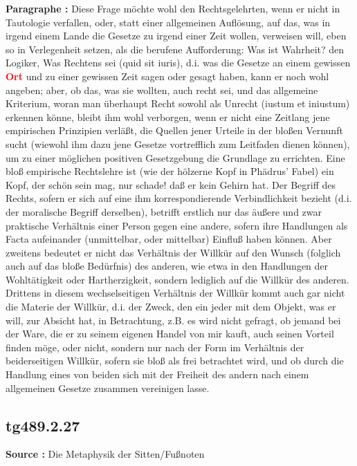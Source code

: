 \documentclass[a4paper,12pt,twoside]{book}
\newcommand{\match}[1]{\textcolor{red}{\textbf{#1}}}
\begin{document}
	\textbf{Paragraphe : }Diese Frage möchte wohl den Rechtsgelehrten, wenn er nicht in Tautologie verfallen, oder, statt einer allgemeinen Auflösung, auf das, was in irgend einem Lande die Gesetze zu irgend einer Zeit wollen, verweisen will, eben so in Verlegenheit setzen, als die berufene Aufforderung: Was ist Wahrheit? den Logiker, Was Rechtens sei (quid sit iuris), d.i. was die Gesetze an einem gewissen \match{Ort} und zu einer gewissen Zeit sagen oder gesagt haben, kann er noch wohl angeben; aber, ob das, was sie wollten, auch recht sei, und das allgemeine Kriterium, woran man überhaupt Recht sowohl als Unrecht (iustum et iniustum) erkennen könne, bleibt ihm wohl verborgen, wenn er nicht eine Zeitlang jene empirischen Prinzipien verläßt, die Quellen jener Urteile in der bloßen Vernunft sucht (wiewohl ihm dazu jene Gesetze vortrefflich zum Leitfaden dienen können), um zu einer möglichen positiven Gesetzgebung die Grundlage zu errichten. Eine bloß empirische Rechtslehre ist (wie der hölzerne Kopf in Phädrus' Fabel) ein Kopf, der schön sein mag, nur schade! daß er kein Gehirn hat.  Der Begriff des Rechts, sofern er sich auf eine ihm korrespondierende Verbindlichkeit bezieht (d.i. der moralische Begriff derselben), betrifft erstlich nur das äußere und zwar praktische Verhältnis einer Person gegen eine andere, sofern ihre Handlungen als Facta aufeinander (unmittelbar, oder mittelbar) Einfluß haben können. Aber zweitens bedeutet er nicht das Verhältnis der Willkür auf den Wunsch (folglich auch auf das bloße Bedürfnis) des anderen, wie etwa in den Handlungen der Wohltätigkeit oder Hartherzigkeit, sondern lediglich auf die Willkür des anderen. Drittens in diesem wechselseitigen Verhältnis der Willkür kommt auch gar nicht die Materie der Willkür, d.i. der Zweck, den ein jeder mit dem Objekt, was er will, zur Absicht hat, in Betrachtung, z.B. es wird nicht gefragt, ob jemand bei der Ware, die er zu seinem eigenen Handel von mir kauft, auch seinen Vorteil finden möge, oder nicht, sondern nur nach der Form im Verhältnis der beiderseitigen Willkür, sofern sie bloß als frei betrachtet wird, und ob durch die Handlung eines von beiden sich mit der Freiheit des andern nach einem allgemeinen Gesetze zusammen vereinigen lasse. 
	
	\subsection*{tg489.2.27} 
	\textbf{Source : }Die Metaphysik der Sitten/Fußnoten\\  
	
\end{document}
